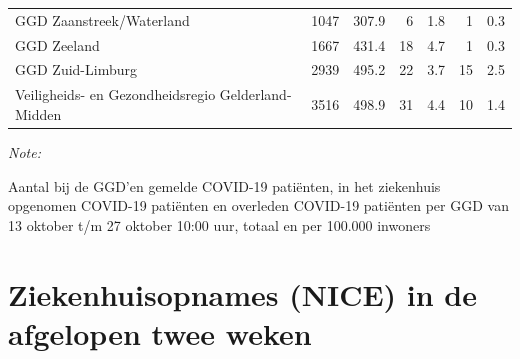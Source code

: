 \documentclass[
  english,
  man,floatsintext]{apa6}
\begin{document}
\begin{table}
\begin{threeparttable}
\begin{tabular}{lrrrrrr}
GGD Zaanstreek/Waterland & 1047 & 307.9 & 6 & 1.8 & 1 & 0.3\\
GGD Zeeland & 1667 & 431.4 & 18 & 4.7 & 1 & 0.3\\
GGD Zuid-Limburg & 2939 & 495.2 & 22 & 3.7 & 15 & 2.5\\
Veiligheids- en Gezondheidsregio Gelderland-Midden & 3516 & 498.9 & 31 & 4.4 & 10 & 1.4\\
\bottomrule
\end{tabular}
\begin{tablenotes}
\item \textit{Note: } 
\item Aantal bij de GGD’en gemelde COVID-19 patiënten, in het ziekenhuis opgenomen COVID-19 patiënten en overleden COVID-19 patiënten per GGD van 13 oktober t/m 27 oktober 10:00 uur, totaal en per 100.000 inwoners
\end{tablenotes}
\end{threeparttable}
\endgroup{}
\end{table}

\newpage

\hypertarget{ziekenhuisopnames-nice-in-de-afgelopen-twee-weken}{%
\section{Ziekenhuisopnames (NICE) in de afgelopen twee weken}\label{ziekenhuisopnames-nice-in-de-afgelopen-twee-weken}}
\end{document}
